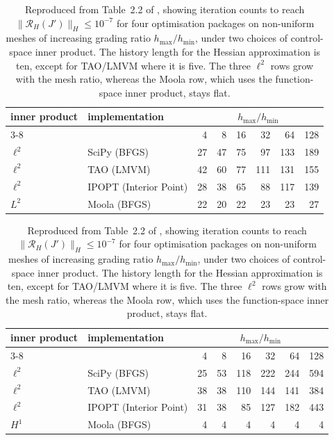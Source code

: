 \documentclass[a4paper,11pt]{article}
\newcommand{\Om}{\Omega}
\newcommand{\Rmap}{\mathcal{R}}              %
\theoremstyle{spacedplain} \newtheorem{theorem}[counter]{Theorem} \newtheorem{lemma}[counter]{Lemma} \newtheorem{prop}[counter]{Proposition} \newtheorem{cor}[counter]{Corollary}
\theoremstyle{spaceddefinition} \newtheorem{defn}[counter]{Definition} \newtheorem{example}[counter]{Example} \newtheorem{remark}[counter]{Remark}
\begin{document}
\begin{table}[H]
  \centering
  \begin{subtable}{\textwidth}
    \centering
    \begin{tabular}{l l r r r r r r}
      \toprule
      inner product & implementation & \multicolumn{6}{c}{$h_{\max}/h_{\min}$} \\
      \cmidrule(lr){3-8}
       & & 4 & 8 & 16 & 32 & 64 & 128 \\
      \midrule
      $\ell^{2}$ & SciPy (BFGS)            & 27 & 47 &  75 &  97 & 133 & 189 \\
      $\ell^{2}$ & TAO (LMVM)              & 42 & 60 &  77 & 111 & 131 & 155 \\
      $\ell^{2}$ & IPOPT (Interior Point)  & 28 & 38 &  65 &  88 & 117 & 139 \\
      \addlinespace
      $L^{2}$    & Moola (BFGS)            & 22 & 20 &  22 &  23 &  23 &  27 \\
      \bottomrule
    \end{tabular}
    \caption{$H = L^{2}(\Om)$}
  \end{subtable}

  \vspace{0.7em}
  \begin{subtable}{\textwidth}
    \centering
    \begin{tabular}{l l r r r r r r}
      \toprule
      inner product & implementation & \multicolumn{6}{c}{$h_{\max}/h_{\min}$} \\
      \cmidrule(lr){3-8}
       & & 4 & 8 & 16 & 32 & 64 & 128 \\
      \midrule
      $\ell^{2}$ & SciPy (BFGS)            & 25 & 53 & 118 & 222 & 244 & 594 \\
      $\ell^{2}$ & TAO (LMVM)              & 38 & 38 & 110 & 144 & 141 & 384 \\
      $\ell^{2}$ & IPOPT (Interior Point)  & 31 & 38 &  85 & 127 & 182 & 443 \\
      \addlinespace
      $H^{1}$    & Moola (BFGS)            &  4 &  4 &   4 &   4 &   4 &   4 \\
      \bottomrule
    \end{tabular}
    \caption{$H = H^{1}(\Om)$}
  \end{subtable}
  \caption{Reproduced from Table~2.2 of \citet{shfp2017}, showing iteration counts to reach $\|\Rmap_H(J')\|_H \le 10^{-7}$ for four optimisation packages on non-uniform meshes of increasing grading ratio $h_{\max}/h_{\min}$, under two choices of control-space inner product. The history length for the Hessian approximation is ten, except for TAO/LMVM where it is five. The three $\ell^{2}$ rows grow with the mesh ratio, whereas the Moola row, which uses the function-space inner product, stays flat.}
  \label{tab:schwedes22}
\end{table}
\end{document}

